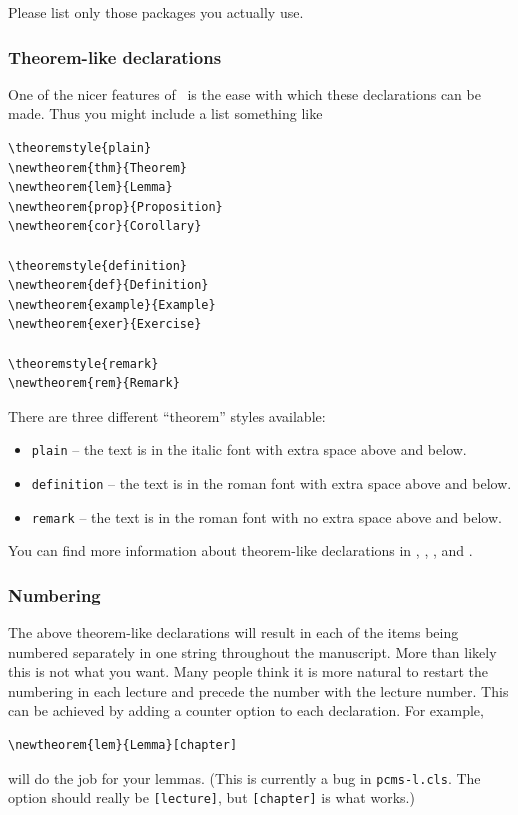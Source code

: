\documentclass[lectures, draft]{pcms-l}
\theoremstyle{plain}
\theoremstyle{definition}
\theoremstyle{remark}
\numberwithin{equation}{chapter}
\newcommand\pcms{\texttt{pcms-l.cls}}
\begin{document}
Please list only those packages you actually use.

\subsubsection{Theorem-like declarations} \label{theorems} One of the
nicer features of \LaTeXe\ is the ease with which these declarations
can be made.  Thus you might include a list something like
\begin{verbatim}
\theoremstyle{plain}
\newtheorem{thm}{Theorem}
\newtheorem{lem}{Lemma}
\newtheorem{prop}{Proposition}
\newtheorem{cor}{Corollary}

\theoremstyle{definition}
\newtheorem{def}{Definition}
\newtheorem{example}{Example}
\newtheorem{exer}{Exercise}

\theoremstyle{remark}
\newtheorem{rem}{Remark}
\end{verbatim}
\enlargethispage{10pt}

There are three different ``theorem'' styles available:
\begin{itemize}
\item {\texttt{plain}} -- the text is in the italic font with extra
  space above and below.
\item {\texttt{definition}} -- the text is in the roman font with extra
  space above and below.
\item {\texttt{remark}} -- the text is in the roman font with no extra
  space above and below.
\end{itemize}

You can find more information about theorem-like declarations in
\cite{amsmath}, \cite{amsthm}, \cite{gratz}, and \cite{guide}.

\subsubsection{Numbering}  \label{numbs}The above theorem-like
declarations will result in each of the items being numbered
separately in one string throughout the manuscript.  More than likely
this is not what you want.  Many people think it is more natural to
restart the numbering in each lecture and precede the number with the
lecture number.  This can be achieved by adding a counter option to
each declaration.  For example,
\begin{verbatim}
\newtheorem{lem}{Lemma}[chapter]
\end{verbatim}
will do the job for your lemmas.  (This is currently a bug in \pcms.
The option should really be \verb-[lecture]-, but \verb-[chapter]- is
what works.)
\end{document}
